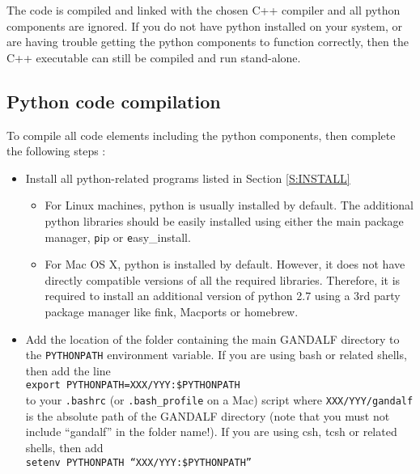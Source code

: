 \documentclass[a4paper]{article}
\newcommand{\var}[1]{\texttt{#1}}
\begin{document}
\noindent The code is compiled and linked with the chosen C++ compiler and all python components are ignored.  If you do not have python installed on your system, or are having trouble getting the python components to function correctly, then the C++ executable can still be compiled and run stand-alone.


\subsection{Python code compilation}
To compile all code elements including the python components, then complete the following steps :
\begin{itemize}

\item Install all python-related programs listed in Section \ref{S:INSTALL}

\begin{itemize}
\item For Linux machines, python is usually installed by default.  The additional python libraries should be easily installed using either the main package manager,  {\var pip} or {\var easy\_install}.
\item For Mac OS X, python is installed by default.  However, it does not have directly compatible versions of all the required libraries.  Therefore, it is required to install an additional version of python 2.7 using a 3rd party package manager like fink, Macports or homebrew.
\end{itemize}

\item Add the location of the folder containing the main GANDALF directory to the \var{PYTHONPATH} environment variable.  If you are using bash or related shells, then add the line \\
\newline
\noindent \var{export PYTHONPATH=XXX/YYY:\$PYTHONPATH} \\

\noindent to your \var{.bashrc} (or \var{.bash\_profile} on a Mac) script where \var{XXX/YYY/gandalf} is the absolute path of the GANDALF directory (note that you must not include ``gandalf'' in the folder name!). If you are using csh, tcsh or related shells, then add \\
\newline
\noindent \var{setenv PYTHONPATH ``XXX/YYY:\$PYTHONPATH''} \\


\end{itemize}
\end{document}
